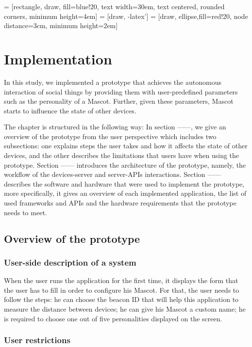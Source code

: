  = [rectangle, draw, fill=blue!20, 
    text width=30em, text centered, rounded corners, minimum height=4em]
 = [draw, -latex']
 = [draw, ellipse,fill=red!20, node distance=3cm,
    minimum height=2em]

\chapter{Implementation}
\label{ch:implementation}

In this study, we implemented a prototype that achieves the autonomous interaction of social things by providing them with user-predefined parameters such as the personality of a Mascot. Further, given these parameters, Mascot starts to influence the state of other devices.

The chapter is structured in the following way: In section ------, we give an overview of the prototype from the user perspective which includes two subsections: one explains steps the user takes and how it affects the state of other devices, and the other describes the limitations that users have when using the prototype. Section ------ introduces the architecture of the prototype, namely, the workflow of the devices-server and server-APIs interactions. Section  ------ describes the software and hardware that were used to implement the prototype, more specifically, it gives an overview of each implemented application, the list of used frameworks and APIs and the hardware requirements that the prototype needs to meet.

\section{Overview of the prototype}

\subsection{User-side description of a system}
When the user runs the application for the first time, it displays the form that the user has to fill in order to configure his Mascot. For that, the user needs to follow the steps: he can choose the beacon ID that will help this application to measure the distance between devices; he can give his Mascot a custom name; he is required to choose one out of five personalities displayed on the screen.

\subsection{User restrictions}

